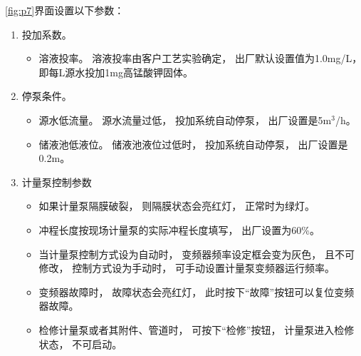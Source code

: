 \documentclass[UTF8,a4paper,12pt,titlepage]{ctexart}
\begin{document}
            \ref{fig:p7}界面设置以下参数：
            \begin{enumerate}
                \item 投加系数。
                    \begin{itemize}
                        \item 溶液投率。
                        溶液投率由客户工艺实验确定，
                        出厂默认设置值为1.0mg/L，
                        即每L源水投加1mg高锰酸钾固体。
                    \end{itemize}
                \item 停泵条件。
                    \begin{itemize}
                    \item 源水低流量。
                    源水流量过低，
                    投加系统自动停泵，
                    出厂设置是5m$^{3}$/h。
                    \item 储液池低液位。
                    储液池液位过低时，
                    投加系统自动停泵，
                    出厂设置是0.2m。
                    \end{itemize}
                \item 计量泵控制参数
                    \begin{itemize}
                        \item 如果计量泵隔膜破裂，
                            则隔膜状态会亮红灯，
                            正常时为绿灯。
                        \item 冲程长度按现场计量泵的实际冲程长度填写，
                            出厂设置为60\%。
                        \item 当计量泵控制方式设为自动时，
                            变频器频率设定框会变为灰色，
                            且不可修改，
                            控制方式设为手动时，
                            可手动设置计量泵变频器运行频率。
                        \item 变频器故障时，
                            故障状态会亮红灯，
                            此时按下“故障”按钮可以复位变频器故障。
                        \item 检修计量泵或者其附件、管道时，
                            可按下“检修”按钮，
                            计量泵进入检修状态，
                            不可启动。
                    \end{itemize}
            \end{enumerate}
\end{document}
